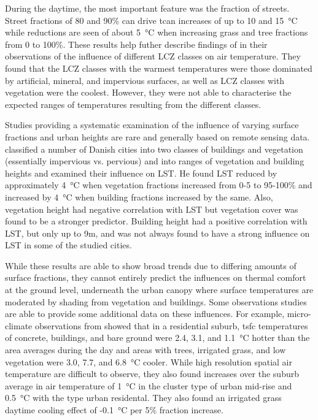 \documentclass[final,3p,times,authoryear]{elsarticle}
\begin{document}
During the daytime, the most important feature was the fraction of streets. Street fractions of 80 and 90\% can drive \gls{tcan} increases of up to 10 and 15\SI{}{\degreeCelsius} while reductions are seen of about 5\SI{}{\degreeCelsius} when increasing grass and tree fractions from 0 to 100\%. These results help futher describe findings of \cite{Emery2021} in their observations of the influence of different LCZ classes on air temperature. They found that the LCZ classes with the warmest temperatures were those dominated by artificial, mineral, and impervious surfaces, as well as LCZ classes with vegetation were the coolest. However, they were not able to characterise the expected ranges of temperatures resulting from the different classes.

Studies providing a systematic examination of the influence of varying surface fractions and urban heights are rare and generally based on remote sensing data. \cite{Alexander2021} classified a number of Danish cities into two classes of buildings and vegetation (essentially impervious vs. pervious) and into ranges of vegetation and building heights and examined their influence on LST. He found LST reduced by approximately 4\SI{}{\degreeCelsius} when vegetation fractions increased from 0-5 to 95-100\% and increased by 4\SI{}{\degreeCelsius} when building fractions increased by the same. Also, vegetation height had negative correlation with LST but vegetation cover was found to be a stronger predictor. Building height had a positive correlation with LST, but only up to 9m, and was not always found to have a strong influence on LST in some of the studied cities.

While these results are able to show broad trends due to differing amounts of surface fractions, they cannot entirely predict the influences on thermal comfort at the ground level, underneath the urban canopy where surface temperatures are moderated by shading from vegetation and buildings. Some observations studies are able to provide some additional data on these influences. For example, micro-climate observations from \cite{Broadbent2017a} showed that in a residential suburb, \gls{tsfc} temperatures of concrete, buildings, and bare ground were 2.4, 3.1, and 1.1\SI{}{\degreeCelsius} hotter than the area averages during the day and areas with trees, irrigated grass, and low vegetation were 3.0, 7.7, and 6.8\SI{}{\degreeCelsius} cooler. While high resolution spatial air temperature are difficult to observe, they also found increases over the suburb average in air temperature of 1\SI{}{\degreeCelsius} in the cluster type of urban mid-rise and 0.5\SI{}{\degreeCelsius} with the type urban residental. They also found an irrigated grass daytime cooling effect of -0.1\SI{}{\degreeCelsius} per 5\% fraction increase.
\end{document}

